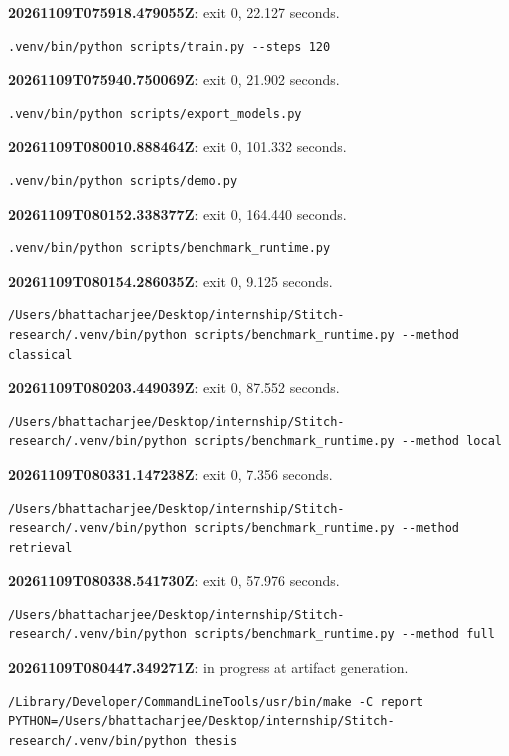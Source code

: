 \noindent\textbf{20261109T075918.479055Z}: exit 0, 22.127 seconds.
\begin{lstlisting}[numbers=none]
.venv/bin/python scripts/train.py --steps 120
\end{lstlisting}

\noindent\textbf{20261109T075940.750069Z}: exit 0, 21.902 seconds.
\begin{lstlisting}[numbers=none]
.venv/bin/python scripts/export_models.py
\end{lstlisting}

\noindent\textbf{20261109T080010.888464Z}: exit 0, 101.332 seconds.
\begin{lstlisting}[numbers=none]
.venv/bin/python scripts/demo.py
\end{lstlisting}

\noindent\textbf{20261109T080152.338377Z}: exit 0, 164.440 seconds.
\begin{lstlisting}[numbers=none]
.venv/bin/python scripts/benchmark_runtime.py
\end{lstlisting}

\noindent\textbf{20261109T080154.286035Z}: exit 0, 9.125 seconds.
\begin{lstlisting}[numbers=none]
/Users/bhattacharjee/Desktop/internship/Stitch-research/.venv/bin/python scripts/benchmark_runtime.py --method classical
\end{lstlisting}

\noindent\textbf{20261109T080203.449039Z}: exit 0, 87.552 seconds.
\begin{lstlisting}[numbers=none]
/Users/bhattacharjee/Desktop/internship/Stitch-research/.venv/bin/python scripts/benchmark_runtime.py --method local
\end{lstlisting}

\noindent\textbf{20261109T080331.147238Z}: exit 0, 7.356 seconds.
\begin{lstlisting}[numbers=none]
/Users/bhattacharjee/Desktop/internship/Stitch-research/.venv/bin/python scripts/benchmark_runtime.py --method retrieval
\end{lstlisting}

\noindent\textbf{20261109T080338.541730Z}: exit 0, 57.976 seconds.
\begin{lstlisting}[numbers=none]
/Users/bhattacharjee/Desktop/internship/Stitch-research/.venv/bin/python scripts/benchmark_runtime.py --method full
\end{lstlisting}

\noindent\textbf{20261109T080447.349271Z}: in progress at artifact generation.
\begin{lstlisting}[numbers=none]
/Library/Developer/CommandLineTools/usr/bin/make -C report PYTHON=/Users/bhattacharjee/Desktop/internship/Stitch-research/.venv/bin/python thesis
\end{lstlisting}
